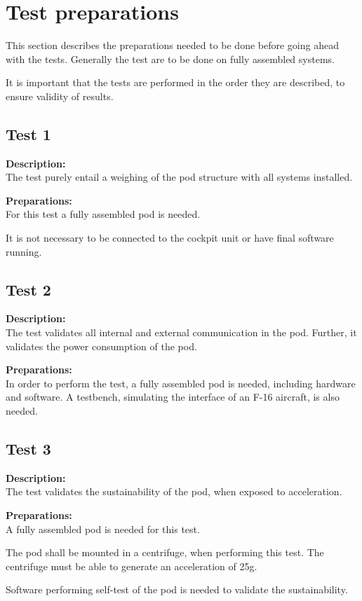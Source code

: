 \documentclass[Main]{subfiles}
\begin{document}
\setcounter{chapter}{2}
\chapter{Test preparations}
This section describes the preparations needed to be done before going ahead with the tests.
Generally the test are to be done on fully assembled systems.

It is important that the tests are performed in the order they are described, to ensure validity of results.

\section{Test 1}
\textbf{Description: }\\
The test purely entail a weighing of the pod structure with all systems installed.

\textbf{Preparations: }\\
For this test a fully assembled pod is needed. 

It is not necessary to be connected to the cockpit unit or have final software running.

\section{Test 2}
\textbf{Description: }\\
The test validates all internal and external communication in the pod. Further, it validates the power consumption of the pod.

\textbf{Preparations: }\\
In order to perform the test, a fully assembled pod is needed, including hardware and software. A testbench, simulating the interface of an F-16 aircraft, is also needed.


\section{Test 3}
\textbf{Description: }\\
The test validates the sustainability of the pod, when exposed to acceleration.

\textbf{Preparations: }\\
A fully assembled pod is needed for this test. 

The pod shall be mounted in a centrifuge, when performing this test.
The centrifuge must be able to generate an acceleration of 25g.

Software performing self-test of the pod is needed to validate the sustainability.
\end{document}
